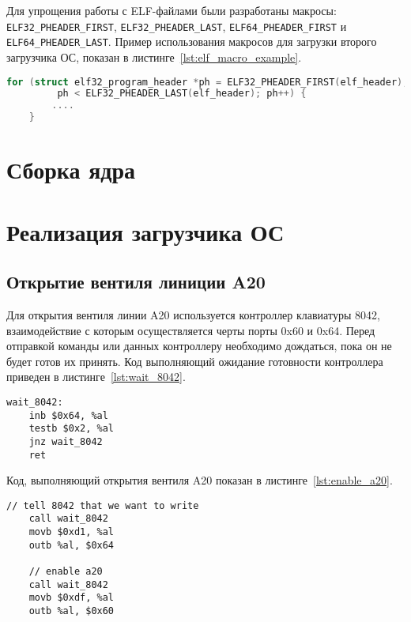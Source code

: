 Для упрощения работы с ELF-файлами были разработаны макросы: \texttt{ELF32\_PHEADER\_FIRST},
\texttt{ELF32\_PHEADER\_LAST}, \texttt{ELF64\_PHEADER\_FIRST} и \texttt{ELF64\_PHEADER\_LAST}.
Пример использования макросов для загрузки второго загрузчика ОС, показан в листинге~\ref{lst:elf_macro_example}.

\begin{lstlisting}[language=C,
caption={Пример использования макросов для работы с ELF-файлами},
label={lst:elf_macro_example}]
	for (struct elf32_program_header *ph = ELF32_PHEADER_FIRST(elf_header);
	     ph < ELF32_PHEADER_LAST(elf_header); ph++) {
		....
	}
\end{lstlisting}

\section{Сборка ядра}

\section{Реализация загрузчика ОС}
\subsection{Открытие вентиля линиции A20}
Для открытия вентиля линии A20 используется контроллер клавиатуры 8042, взаимодействие с которым
осуществляется черты порты 0x60 и 0x64. Перед отправкой команды или данных контроллеру необходимо дождаться, пока
он не будет готов их принять. Код выполняющий ожидание готовности контроллера приведен в листинге~\ref{lst:wait_8042}.

\begin{lstlisting}[language={[x86masm]Assembler},
caption={Ожидание готовности контроллера 8042},label={lst:wait_8042}]
wait_8042:
	inb $0x64, %al
	testb $0x2, %al
	jnz wait_8042
	ret
\end{lstlisting}

Код, выполняющий открытия вентиля A20 показан в листинге~\ref{lst:enable_a20}.

\begin{lstlisting}[language={[x86masm]Assembler},
caption={Открытие вентиля линии A20},label={lst:enable_a20}]
	// tell 8042 that we want to write
	call wait_8042
	movb $0xd1, %al
	outb %al, $0x64

	// enable a20
	call wait_8042
	movb $0xdf, %al
	outb %al, $0x60
\end{lstlisting}

